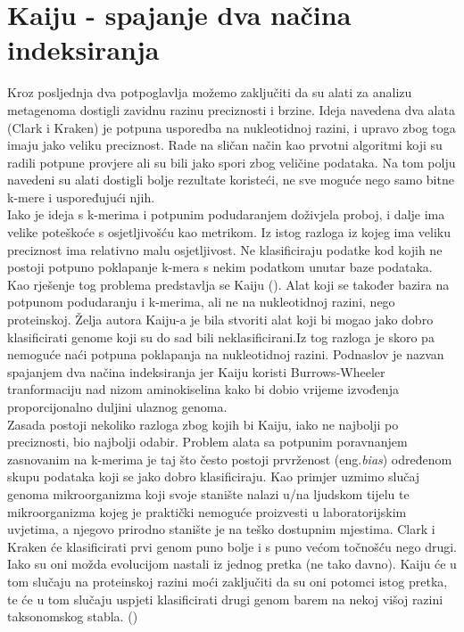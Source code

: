 \documentclass[times, utf8, seminar]{fer}
\begin{document}
\section{Kaiju - spajanje dva načina indeksiranja}
Kroz posljednja dva potpoglavlja možemo zaključiti da su alati za analizu metagenoma dostigli zavidnu razinu preciznosti i brzine. Ideja navedena dva alata (Clark i Kraken) je potpuna usporedba na nukleotidnoj razini, i upravo zbog toga imaju jako veliku preciznost. Rade na sličan način kao prvotni algoritmi koji su radili potpune provjere ali su bili jako spori zbog veličine podataka. Na tom polju navedeni su alati dostigli bolje rezultate koristeći, ne sve moguće nego samo bitne k-mere i uspoređujući njih.
\\Iako je ideja s k-merima i potpunim podudaranjem doživjela proboj, i dalje ima velike poteškoće s osjetljivošću kao metrikom. Iz istog razloga iz kojeg ima veliku preciznost ima relativno malu osjetljivost. Ne klasificiraju podatke kod kojih ne postoji potpuno poklapanje k-mera s nekim podatkom unutar baze podataka.
\\Kao rješenje tog problema predstavlja se Kaiju (\cite{Kaiju}). Alat koji se također bazira na potpunom podudaranju i k-merima, ali ne na nukleotidnoj razini, nego proteinskoj. Želja autora Kaiju-a je bila stvoriti alat koji bi mogao jako dobro klasificirati genome koji su do sad bili neklasificirani.Iz tog razloga je skoro pa nemoguće naći potpuna poklapanja na nukleotidnoj razini. Podnaslov je nazvan spajanjem dva načina indeksiranja jer Kaiju koristi Burrows-Wheeler tranformaciju nad nizom aminokiselina kako bi dobio vrijeme izvođenja proporcijonalno duljini ulaznog genoma.
\\Zasada postoji nekoliko razloga zbog kojih bi Kaiju, iako ne najbolji po preciznosti, bio najbolji odabir. Problem alata sa potpunim poravnanjem zasnovanim na k-merima je taj što često postoji prvrženost (eng.\textit{bias}) određenom skupu podataka koji se jako dobro klasificiraju. Kao primjer uzmimo slučaj genoma mikroorganizma koji svoje stanište nalazi u/na ljudskom tijelu te mikroorganizma kojeg je praktički nemoguće proizvesti u laboratorijskim uvjetima, a njegovo prirodno stanište je na teško dostupnim mjestima. Clark i Kraken će klasificirati prvi genom puno bolje i s puno većom točnošću nego drugi. Iako su oni možda evolucijom nastali iz jednog pretka (ne tako davno). Kaiju će u tom slučaju na proteinskoj razini moći zaključiti da su oni potomci istog pretka, te će u tom slučaju uspjeti klasificirati drugi genom barem na nekoj višoj razini taksonomskog stabla. (\cite{Kaiju})
\end{document}
